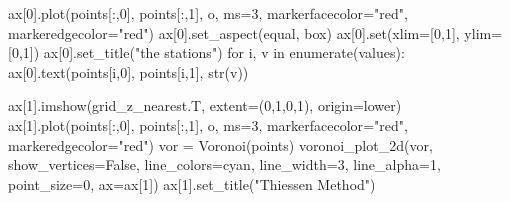 \documentclass[
  letterpaper,
  DIV=11,
  numbers=noendperiod]{scrreprt}
\newenvironment{Shaded}{\begin{snugshade}}{\end{snugshade}}
\newcommand{\BuiltInTok}[1]{\textcolor[rgb]{0.00,0.23,0.31}{#1}}
\newcommand{\ControlFlowTok}[1]{\textcolor[rgb]{0.00,0.23,0.31}{#1}}
\newcommand{\DecValTok}[1]{\textcolor[rgb]{0.68,0.00,0.00}{#1}}
\newcommand{\KeywordTok}[1]{\textcolor[rgb]{0.00,0.23,0.31}{#1}}
\newcommand{\NormalTok}[1]{\textcolor[rgb]{0.00,0.23,0.31}{#1}}
\newcommand{\OperatorTok}[1]{\textcolor[rgb]{0.37,0.37,0.37}{#1}}
\newcommand{\StringTok}[1]{\textcolor[rgb]{0.13,0.47,0.30}{#1}}
\newcommand{\VariableTok}[1]{\textcolor[rgb]{0.07,0.07,0.07}{#1}}
\begin{document}
\begin{Shaded}
\begin{Highlighting}[]
\NormalTok{ax[}\DecValTok{0}\NormalTok{].plot(points[:,}\DecValTok{0}\NormalTok{], points[:,}\DecValTok{1}\NormalTok{], }\StringTok{\textquotesingle{}o\textquotesingle{}}\NormalTok{, ms}\OperatorTok{=}\DecValTok{3}\NormalTok{, markerfacecolor}\OperatorTok{=}\StringTok{"red"}\NormalTok{, markeredgecolor}\OperatorTok{=}\StringTok{"red"}\NormalTok{)}
\NormalTok{ax[}\DecValTok{0}\NormalTok{].set\_aspect(}\StringTok{\textquotesingle{}equal\textquotesingle{}}\NormalTok{, }\StringTok{\textquotesingle{}box\textquotesingle{}}\NormalTok{)}
\NormalTok{ax[}\DecValTok{0}\NormalTok{].}\BuiltInTok{set}\NormalTok{(xlim}\OperatorTok{=}\NormalTok{[}\DecValTok{0}\NormalTok{,}\DecValTok{1}\NormalTok{], ylim}\OperatorTok{=}\NormalTok{[}\DecValTok{0}\NormalTok{,}\DecValTok{1}\NormalTok{])}
\NormalTok{ax[}\DecValTok{0}\NormalTok{].set\_title(}\StringTok{"the stations"}\NormalTok{)}
\ControlFlowTok{for}\NormalTok{ i, v }\KeywordTok{in} \BuiltInTok{enumerate}\NormalTok{(values):}
\NormalTok{    ax[}\DecValTok{0}\NormalTok{].text(points[i,}\DecValTok{0}\NormalTok{], points[i,}\DecValTok{1}\NormalTok{], }\BuiltInTok{str}\NormalTok{(v))}

\NormalTok{ax[}\DecValTok{1}\NormalTok{].imshow(grid\_z\_nearest.T, extent}\OperatorTok{=}\NormalTok{(}\DecValTok{0}\NormalTok{,}\DecValTok{1}\NormalTok{,}\DecValTok{0}\NormalTok{,}\DecValTok{1}\NormalTok{), origin}\OperatorTok{=}\StringTok{\textquotesingle{}lower\textquotesingle{}}\NormalTok{)}
\NormalTok{ax[}\DecValTok{1}\NormalTok{].plot(points[:,}\DecValTok{0}\NormalTok{], points[:,}\DecValTok{1}\NormalTok{], }\StringTok{\textquotesingle{}o\textquotesingle{}}\NormalTok{, ms}\OperatorTok{=}\DecValTok{3}\NormalTok{, markerfacecolor}\OperatorTok{=}\StringTok{"red"}\NormalTok{, markeredgecolor}\OperatorTok{=}\StringTok{"red"}\NormalTok{)}
\NormalTok{vor }\OperatorTok{=}\NormalTok{ Voronoi(points)}
\NormalTok{voronoi\_plot\_2d(vor, show\_vertices}\OperatorTok{=}\VariableTok{False}\NormalTok{, line\_colors}\OperatorTok{=}\StringTok{\textquotesingle{}cyan\textquotesingle{}}\NormalTok{,}
\NormalTok{                line\_width}\OperatorTok{=}\DecValTok{3}\NormalTok{, line\_alpha}\OperatorTok{=}\DecValTok{1}\NormalTok{, point\_size}\OperatorTok{=}\DecValTok{0}\NormalTok{, ax}\OperatorTok{=}\NormalTok{ax[}\DecValTok{1}\NormalTok{])}
\NormalTok{ax[}\DecValTok{1}\NormalTok{].set\_title(}\StringTok{"Thiessen Method"}\NormalTok{)}


\end{Highlighting}
\end{Shaded}
\end{document}
